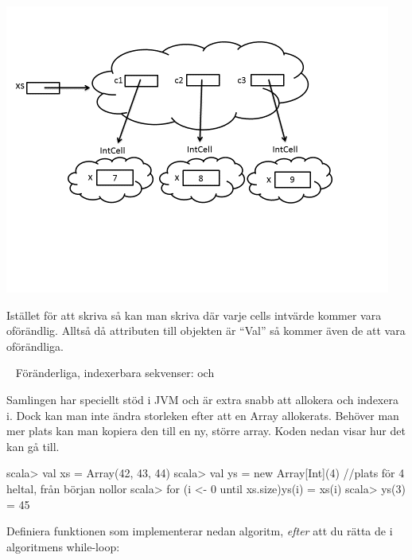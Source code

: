 \SubtaskSolved  \includegraphics{../img/w05-solutions/memory-pic-1}

\SubtaskSolved  Istället för att skriva  så kan man skriva  där varje cells intvärde kommer vara oförändlig.
Alltså då attributen till objekten är “Val” så kommer även de att vara oförändliga.



\QUESTEND









\QUESTBEGIN

\Task  \what~ Föränderliga, indexerbara sekvenser:  och 

\Subtask Samlingen  har speciellt stöd i JVM och är extra snabb att allokera och indexera i. Dock kan man inte ändra storleken efter att en Array allokerats. Behöver man mer plats kan man kopiera den till en ny, större array. Koden nedan visar hur det kan gå till.
\begin{REPL}
scala> val xs = Array(42, 43, 44)
scala> val ys = new Array[Int](4)  //plats för 4 heltal, från början nollor
scala> for (i <- 0 until xs.size){ys(i) = xs(i)}
scala> ys(3) = 45
\end{REPL}
Definiera funktionen  som implementerar nedan algoritm, \emph{efter} att du rätta de \textbf{\color{red}{två buggarna}} i algoritmens while-loop:

